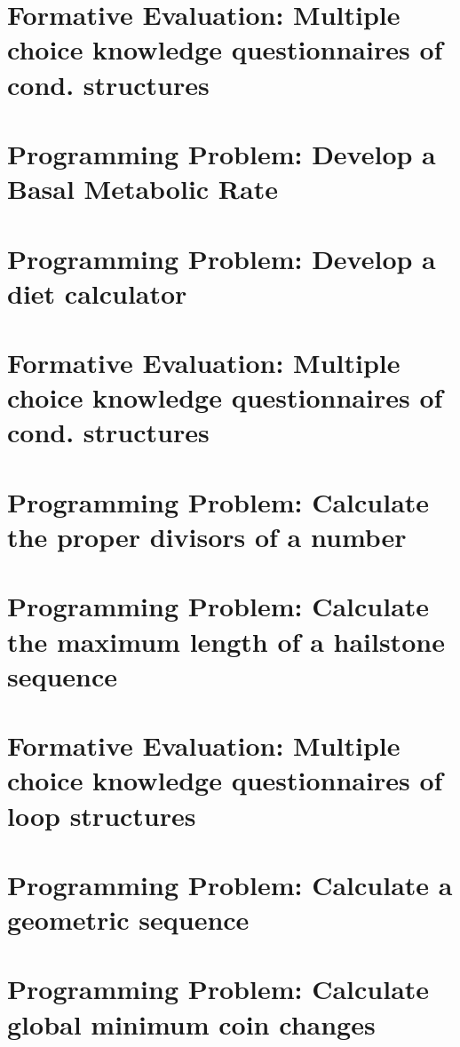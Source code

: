\section{Formative Evaluation: Multiple choice knowledge questionnaires of cond. structures}
\label{annex:first-study-pre}

\newpage
\section{Programming Problem: Develop a Basal Metabolic Rate}
\label{annex:first-study-pA}

\newpage
\section{Programming Problem: Develop a diet calculator}
\label{annex:first-study-pB}

\newpage
\section{Formative Evaluation: Multiple choice knowledge questionnaires of cond. structures}
\label{annex:first-study-pos}

\newpage
\section{Programming Problem: Calculate the proper divisors of a number}
\label{annex:second-study-p2}

\newpage
\section{Programming Problem: Calculate the maximum length of a hailstone sequence}
\label{annex:second-study-p3}

\newpage
\section{Formative Evaluation: Multiple choice knowledge questionnaires of loop structures}
\label{annex:second-study-pre}

\newpage
\section{Programming Problem: Calculate a geometric sequence}
\label{annex:second-study-pC}

\newpage
\section{Programming Problem: Calculate global minimum coin changes}
\label{annex:second-study-pD}

